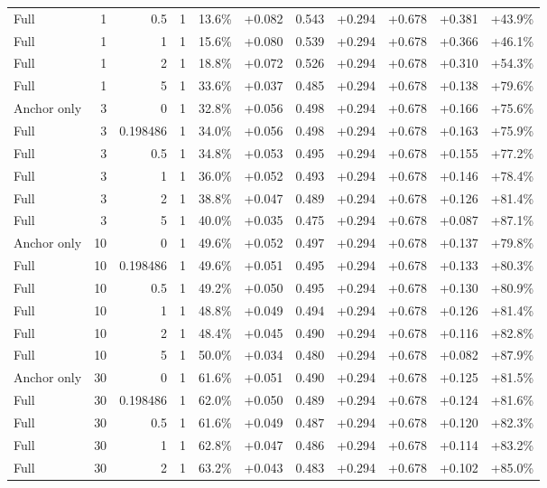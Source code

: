 \begin{table}[htbp]
\begin{tabular}{lrrrccccccc}
Full & 1 & 0.5 & 1 & 13.6\% & +0.082 & 0.543 & +0.294 & +0.678 & +0.381 & +43.9\% \\
Full & 1 & 1 & 1 & 15.6\% & +0.080 & 0.539 & +0.294 & +0.678 & +0.366 & +46.1\% \\
Full & 1 & 2 & 1 & 18.8\% & +0.072 & 0.526 & +0.294 & +0.678 & +0.310 & +54.3\% \\
Full & 1 & 5 & 1 & 33.6\% & +0.037 & 0.485 & +0.294 & +0.678 & +0.138 & +79.6\% \\
Anchor only & 3 & 0 & 1 & 32.8\% & +0.056 & 0.498 & +0.294 & +0.678 & +0.166 & +75.6\% \\
Full & 3 & 0.198486 & 1 & 34.0\% & +0.056 & 0.498 & +0.294 & +0.678 & +0.163 & +75.9\% \\
Full & 3 & 0.5 & 1 & 34.8\% & +0.053 & 0.495 & +0.294 & +0.678 & +0.155 & +77.2\% \\
Full & 3 & 1 & 1 & 36.0\% & +0.052 & 0.493 & +0.294 & +0.678 & +0.146 & +78.4\% \\
Full & 3 & 2 & 1 & 38.8\% & +0.047 & 0.489 & +0.294 & +0.678 & +0.126 & +81.4\% \\
Full & 3 & 5 & 1 & 40.0\% & +0.035 & 0.475 & +0.294 & +0.678 & +0.087 & +87.1\% \\
Anchor only & 10 & 0 & 1 & 49.6\% & +0.052 & 0.497 & +0.294 & +0.678 & +0.137 & +79.8\% \\
Full & 10 & 0.198486 & 1 & 49.6\% & +0.051 & 0.495 & +0.294 & +0.678 & +0.133 & +80.3\% \\
Full & 10 & 0.5 & 1 & 49.2\% & +0.050 & 0.495 & +0.294 & +0.678 & +0.130 & +80.9\% \\
Full & 10 & 1 & 1 & 48.8\% & +0.049 & 0.494 & +0.294 & +0.678 & +0.126 & +81.4\% \\
Full & 10 & 2 & 1 & 48.4\% & +0.045 & 0.490 & +0.294 & +0.678 & +0.116 & +82.8\% \\
Full & 10 & 5 & 1 & 50.0\% & +0.034 & 0.480 & +0.294 & +0.678 & +0.082 & +87.9\% \\
Anchor only & 30 & 0 & 1 & 61.6\% & +0.051 & 0.490 & +0.294 & +0.678 & +0.125 & +81.5\% \\
Full & 30 & 0.198486 & 1 & 62.0\% & +0.050 & 0.489 & +0.294 & +0.678 & +0.124 & +81.6\% \\
Full & 30 & 0.5 & 1 & 61.6\% & +0.049 & 0.487 & +0.294 & +0.678 & +0.120 & +82.3\% \\
Full & 30 & 1 & 1 & 62.8\% & +0.047 & 0.486 & +0.294 & +0.678 & +0.114 & +83.2\% \\
Full & 30 & 2 & 1 & 63.2\% & +0.043 & 0.483 & +0.294 & +0.678 & +0.102 & +85.0\% \\

\end{tabular}
\end{table}
